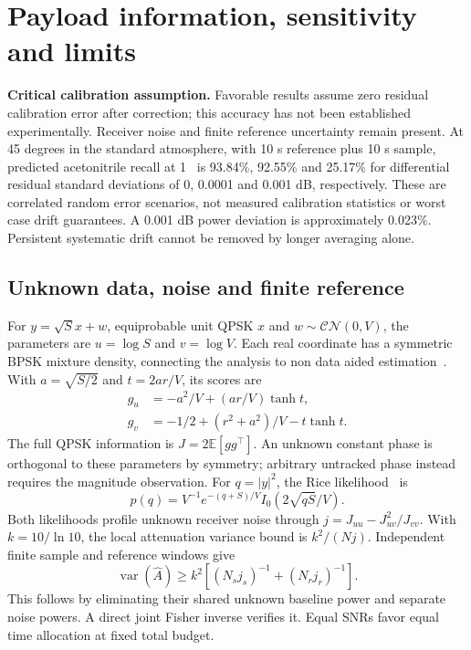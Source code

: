 
\section{Payload information, sensitivity and limits}
\noindent\textbf{Critical calibration assumption.} Favorable results assume zero residual calibration error after correction; this accuracy has not been established experimentally. Receiver noise and finite reference uncertainty remain present. At 45 degrees in the standard atmosphere, with 10 s reference plus 10 s sample, predicted acetonitrile recall at 1 \ugm\ is 93.84\%, 92.55\% and 25.17\% for differential residual standard deviations of 0, 0.0001 and 0.001 dB, respectively. These are correlated random error scenarios, not measured calibration statistics or worst case drift guarantees. A 0.001 dB power deviation is approximately 0.023\%. Persistent systematic drift cannot be removed by longer averaging alone.
\subsection{Unknown data, noise and finite reference}
For $y=\sqrt{S}x+w$, equiprobable unit QPSK $x$ and $w\sim\mathcal{CN}(0,V)$, the parameters are $u=\log S$ and $v=\log V$. Each real coordinate has a symmetric BPSK mixture density, connecting the analysis to non data aided estimation~\cite{nda}. With $a=\sqrt{S/2}$ and $t=2ar/V$, its scores are
\begin{align}
g_u&=-a^2/V+(ar/V)\tanh t,\\
g_v&=-1/2+(r^2+a^2)/V-t\tanh t.
\end{align}
The full QPSK information is $J=2\mathbb E[gg^\top]$. An unknown constant phase is orthogonal to these parameters by symmetry; arbitrary untracked phase instead requires the magnitude observation. For $q=|y|^2$, the Rice likelihood~\cite{rice} is
\begin{equation}
p(q)=V^{-1}e^{-(q+S)/V}I_0(2\sqrt{qS}/V).
\end{equation}
Both likelihoods profile unknown receiver noise through $j=J_{uu}-J_{uv}^2/J_{vv}$. With $k=10/\ln 10$, the local attenuation variance bound is $k^2/(Nj)$. Independent finite sample and reference windows give
\begin{equation}
\operatorname{var}(\widehat A)\geq k^2\left[(N_sj_s)^{-1}+(N_rj_r)^{-1}\right].
\end{equation}
This follows by eliminating their shared unknown baseline power and separate noise powers. A direct joint Fisher inverse verifies it. Equal SNRs favor equal time allocation at fixed total budget.

